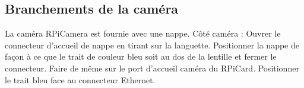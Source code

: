 \subsection{Branchements de la caméra}
La caméra \gls{RPiCamera} est fournie avec une nappe. Côté caméra : Ouvrer le connecteur d'accueil de nappe en tirant sur la languette. 
Positionner la nappe de façon à ce que le trait de couleur bleu soit au dos de la lentille et fermer le connecteur. 
Faire de même sur le port d'accueil caméra du \gls{RPiCard}. Positionner le trait bleu face au connecteur Ethernet.
